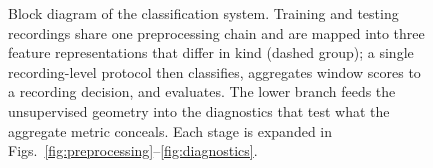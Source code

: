 \begin{figure}[t]
{}
\caption{Block diagram of the classification system. Training and testing
recordings share one preprocessing chain and are mapped into three feature
representations that differ in kind (dashed group); a single recording-level
protocol then classifies, aggregates window scores to a recording decision, and
evaluates. The lower branch feeds the unsupervised geometry into the diagnostics
that test what the aggregate metric conceals. Each stage is expanded in
Figs.~\ref{fig:preprocessing}--\ref{fig:diagnostics}.}
\label{fig:pipeline}
\end{figure}
